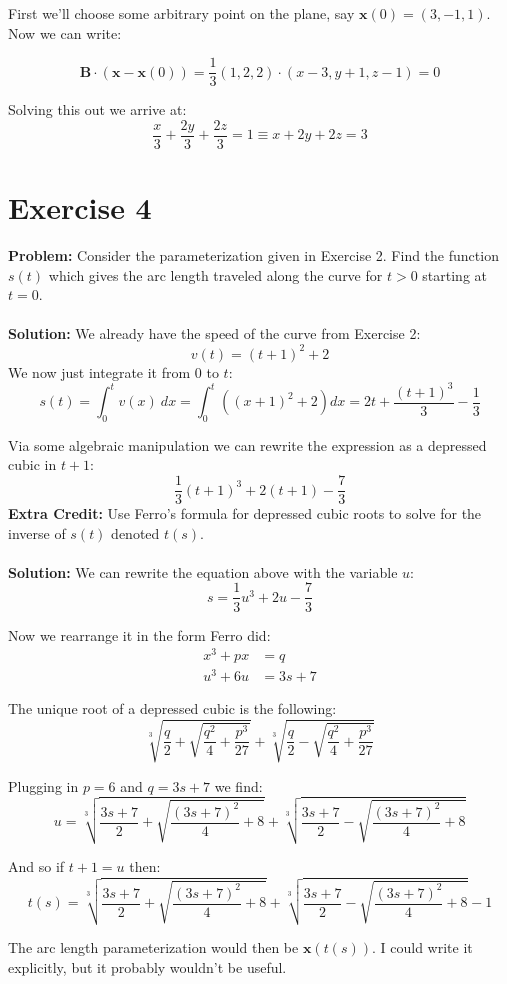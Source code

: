 \documentclass{article}
\begin{document}
First we'll choose some arbitrary point on the plane, say $\mathbf x(0)=(3,-1,1)$. Now we can write:

$$\mathbf B\cdot(\mathbf x-\mathbf x(0))=\frac{1}{3}(1,2,2)\cdot(x-3,y+1,z-1)=0$$

Solving this out we arrive at:
$$\frac{x}{3}+\frac{2y}{3}+\frac{2z}{3}=1\equiv x+2y+2z=3$$

\section*{Exercise 4}
\textbf{Problem:} Consider the parameterization given in Exercise 2. Find the function $s(t)$ which gives the arc length traveled along the curve for $t>0$ starting at $t=0$.
\\\\
\textbf{Solution:} We already have the speed of the curve from Exercise 2:
$$v(t)=(t+1)^2+2$$
We now just integrate it from 0 to $t$:
$$s(t)=\int_0^t v(x)\ dx=\int_0^t \left((x+1)^2+2\right)dx=2t+\frac{(t+1)^3}{3}-\frac{1}{3}$$

Via some algebraic manipulation we can rewrite the expression as a depressed cubic in $t+1$:
$$\frac{1}{3}(t+1)^3+2(t+1)-\frac{7}{3}$$
\textbf{Extra Credit:} Use Ferro's formula for depressed cubic roots to solve for the inverse of $s(t)$ denoted $t(s)$.
\\\\
\textbf{Solution:} We can rewrite the equation above with the variable $u$:
$$s=\frac{1}{3}u^3+2u-\frac{7}{3}$$

Now we rearrange it in the form Ferro did:
\begin{align*}
  x^3+px&=q\\
  u^3+6u&=3s+7
\end{align*}

The unique root of a depressed cubic is the following:
$$\sqrt[3]{\frac{q}{2}+\sqrt{\frac{q^2}{4}+\frac{p^3}{27}}}+\sqrt[3]{\frac{q}{2}-\sqrt{\frac{q^2}{4}+\frac{p^3}{27}}}$$

Plugging in $p=6$ and $q=3s+7$ we find:
$$u=\sqrt[3]{\frac{3s+7}{2}+\sqrt{\frac{(3s+7)^2}{4}+8}}+\sqrt[3]{\frac{3s+7}{2}-\sqrt{\frac{(3s+7)^2}{4}+8}}$$

And so if $t+1=u$ then:
$$t(s)=\sqrt[3]{\frac{3s+7}{2}+\sqrt{\frac{(3s+7)^2}{4}+8}}+\sqrt[3]{\frac{3s+7}{2}-\sqrt{\frac{(3s+7)^2}{4}+8}}-1$$

The arc length parameterization would then be $\mathbf x(t(s))$. I could write it explicitly, but it probably wouldn't be useful.
\end{document}
